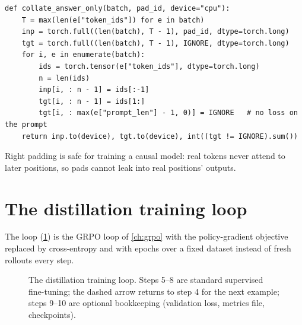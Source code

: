 \begin{lstlisting}[caption={Padded batch with prompt and pad positions masked out.},
label={lst:distill:collate}]
def collate_answer_only(batch, pad_id, device="cpu"):
    T = max(len(e["token_ids"]) for e in batch)
    inp = torch.full((len(batch), T - 1), pad_id, dtype=torch.long)
    tgt = torch.full((len(batch), T - 1), IGNORE, dtype=torch.long)
    for i, e in enumerate(batch):
        ids = torch.tensor(e["token_ids"], dtype=torch.long)
        n = len(ids)
        inp[i, : n - 1] = ids[:-1]
        tgt[i, : n - 1] = ids[1:]
        tgt[i, : max(e["prompt_len"] - 1, 0)] = IGNORE   # no loss on the prompt
    return inp.to(device), tgt.to(device), int((tgt != IGNORE).sum())
\end{lstlisting}

Right padding is safe for training a causal model: real tokens never attend to later
positions, so pads cannot leak into real positions' outputs.

\section{The distillation training loop}\label{sec:distill:loop}

The loop (\cref{fig:distill:loop}) is the GRPO loop of \cref{ch:grpo} with the policy-gradient
objective replaced by cross-entropy and with epochs over a fixed dataset instead of fresh
rollouts every step.

\begin{figure}[t]
\centering
{}
\caption{The distillation training loop. Steps 5--8 are standard supervised fine-tuning;
the dashed arrow returns to step 4 for the next example; steps 9--10 are optional bookkeeping
(validation loss, metrics file, checkpoints).}
\label{fig:distill:loop}
\end{figure}


